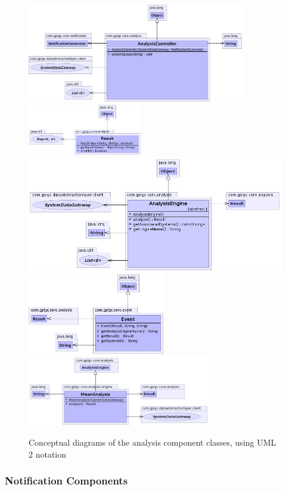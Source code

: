 \documentclass[10pt,a4paper]{article}
\begin{document}
\begin{figure}[ht!]
  \centering
  \includegraphics[width= 9.5cm]{images/Analysis/AnalysisController.png}
  \includegraphics[width= 5cm]{images/Analysis/Result.png}
  \includegraphics[width= 12cm]{images/Analysis/AnalysisEngine.png}
  \includegraphics[width= 6cm]{images/Analysis/Event.png}
  \includegraphics[width= 8cm]{images/Analysis/MeanAnalysis.png}
  \caption{Conceptual diagrams of the analysis component classes, using 
UML 2 notation}
  \label{fig:dataAnalysisComponent}
\end{figure}

\subsubsection{Notification Components}
\end{document}
